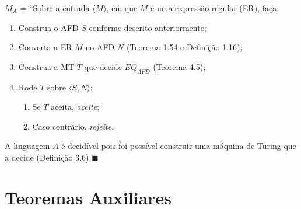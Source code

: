 \documentclass[12pt,a4paper,oneside]{article}
\begin{document}
\begin{enumerate}
{		$M_A$ = ``Sobre a entrada $\langle M \rangle$, em que $M$ é uma expressão regular (ER), faça:
		\begin{enumerate}
			\item Construa o AFD $S$ conforme descrito anteriormente;
			\item Converta a ER $M$ no AFD $N$ (Teorema 1.54 e Definição 1.16);
			\item Construa a MT $T$ que decide $EQ_{AFD}$ (Teorema 4.5);
			\item Rode $T$ sobre $\langle S, N \rangle$;
			\begin{enumerate}
				\item Se $T$ aceita, {\it aceite};
				\item Caso contrário, {\it rejeite}.
			\end{enumerate}					
		\end{enumerate}
		
		A linguagem $A$ é decidível pois foi possível construir uma máquina de Turing que a decide (Definição 3.6) $\blacksquare$
		
	}

\end{enumerate}

\section*{Teoremas Auxiliares}
\end{document}
